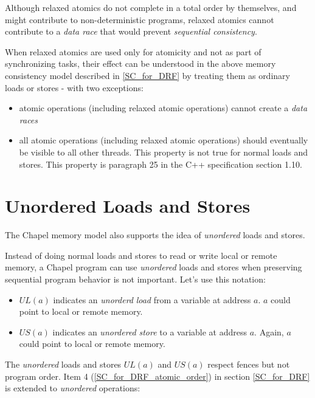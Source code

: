 Although relaxed atomics do not complete in a total order by themselves,
and might contribute to non-deterministic programs, relaxed atomics cannot
contribute to a \textit{data race} that would prevent \textit{sequential
consistency}.

When relaxed atomics are used only for atomicity and not as part of
synchronizing tasks, their effect can be understood in the above memory
consistency model described in \ref{SC_for_DRF} by treating them as
ordinary loads or stores - with two exceptions:

\begin{itemize}

\item atomic operations (including relaxed atomic operations) cannot
create a \textit{data races}

\item all atomic operations (including relaxed atomic operations) should
eventually be visible to all other threads. This property is not true for
normal loads and stores. This property is paragraph 25 in the C++
specification section 1.10.

\end{itemize}

\section{Unordered Loads and Stores}
The Chapel memory model also supports the idea of \textit{unordered} loads
and stores.

Instead of doing normal loads and stores to read or write local or remote
memory, a Chapel program can use \textit{unordered} loads and stores when
preserving sequential program behavior is not important. Let's use this
notation:

\begin{itemize}

  \item $UL(a)$ indicates an \textit{unorderd} \textit{load} from a
  variable at address $a$. $a$ could point to local or remote memory.

  \item $US(a)$ indicates an \textit{unordered} \textit{store} to a
  variable at address $a$. Again, $a$ could point to local or remote
  memory.

\end{itemize}

The \textit{unordered} loads and stores $UL(a)$ and $US(a)$ respect fences
but not program order. Item 4 (\ref{SC_for_DRF_atomic_order}) in section \ref{SC_for_DRF} is
extended to \textit{unordered} operations:

